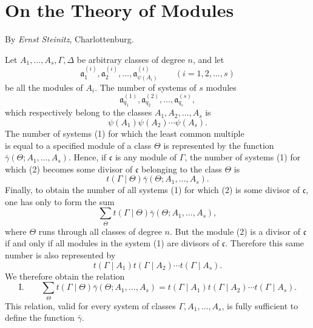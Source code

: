 \documentclass[11pt,a4paper]{article}
\begin{document}
\section*{On the Theory of Modules}
\begin{center}By \emph{Ernst Steinitz}, Charlottenburg.\end{center}

Let $A_1,\ldots,A_s,\Gamma,\Delta$ be arbitrary classes of degree $n$, and let
\[
 \mathfrak a^{(i)}_1,\mathfrak a^{(i)}_2,\ldots,
 \mathfrak a^{(i)}_{\psi(A_i)}\qquad (i=1,2,\ldots,s)
\]
be all the modules of $A_i$. The number of systems of $s$ modules
\begin{equation}
 \mathfrak a^{(1)}_{q_1},\mathfrak a^{(2)}_{q_2},\ldots,
 \mathfrak a^{(s)}_{q_s},
\tag{1}
\end{equation}
which respectively belong to the classes $A_1,A_2,\ldots,A_s$ is
\[
 \psi(A_1)\psi(A_2)\cdots\psi(A_s).
\]
The number of systems (1) for which the least common multiple
\begin{equation}
 [\mathfrak a^{(1)}_{q_1},\mathfrak a^{(2)}_{q_2},\ldots,
 \mathfrak a^{(s)}_{q_s}]
\tag{2}
\end{equation}
is equal to a specified module of a class $\Theta$ is represented by the function $\bar\gamma(\Theta;A_1,\ldots,A_s)$. Hence, if $\mathfrak c$ is any module of $\Gamma$, the number of systems (1) for which (2) becomes some divisor of $\mathfrak c$ belonging to the class $\Theta$ is
\[
 t(\Gamma\mid\Theta)\bar\gamma(\Theta;A_1,\ldots,A_s).
\]
Finally, to obtain the number of all systems (1) for which (2) is some divisor of $\mathfrak c$, one has only to form the sum
\[
 \sum_{\Theta}t(\Gamma\mid\Theta)\bar\gamma(\Theta;A_1,\ldots,A_s),
\]
where $\Theta$ runs through all classes of degree $n$. But the module (2) is a divisor of $\mathfrak c$ if and only if all modules in the system (1) are divisors of $\mathfrak c$. Therefore this same number is also represented by
\[
 t(\Gamma\mid A_1)t(\Gamma\mid A_2)\cdots t(\Gamma\mid A_s).
\]
We therefore obtain the relation
\[
\text{I.}\qquad
 \sum_{\Theta}t(\Gamma\mid\Theta)\bar\gamma(\Theta;A_1,\ldots,A_s)
 =t(\Gamma\mid A_1)t(\Gamma\mid A_2)\cdots t(\Gamma\mid A_s).
\]
This relation, valid for every system of classes $\Gamma,A_1,\ldots,A_s$, is fully sufficient to define the function $\bar\gamma$.
\end{document}
